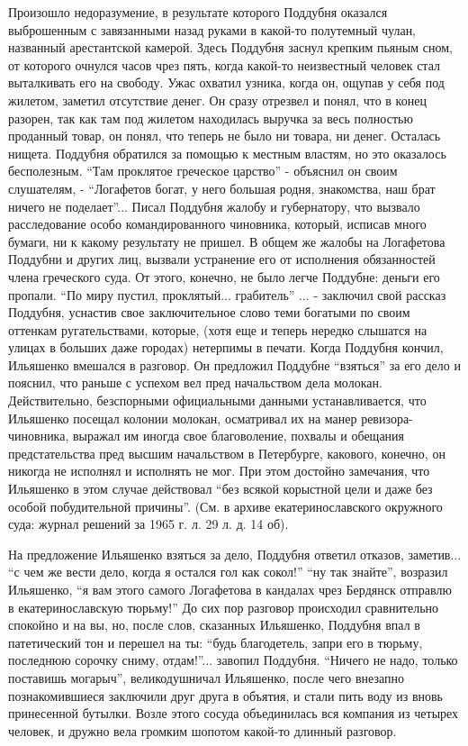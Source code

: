 \documentclass[a4paper,20pt]{article}
\begin{document}
Произошло недоразумение, в результате которого Поддубня оказался выброшенным с
завязанными назад руками в какой-то полутемный чулан, названный арестантской
камерой.  Здесь Поддубня заснул крепким пьяным сном, от которого очнулся часов
чрез пять, когда какой-то неизвестный человек стал выталкивать его на свободу.
Ужас охватил узника, когда он, ощупав у себя под жилетом, заметил отсутствие
денег. Он сразу отрезвел и понял, что в конец разорен, так как там под жилетом
находилась выручка за весь полностью проданный товар, он понял, что теперь не
было ни товара, ни денег. Осталась нищета. Поддубня обратился за помощью к
местным властям, но это оказалось бесполезным. ``Там проклятое греческое
царство'' - объяснил он своим слушателям, - ``Логафетов богат, у него большая
родня, знакомства, наш брат ничего не поделает''...  Писал Поддубня жалобу и
губернатору, что вызвало расследование особо командированного чиновника,
который, исписав много бумаги, ни к какому результату не пришел. В общем же
жалобы на Логафетова Поддубни и других лиц, вызвали
устранение его от исполнения обязанностей члена греческого суда. От этого,
конечно, не было легче Поддубне: деньги его пропали. ``По миру пустил,
проклятый... грабитель'' ... - заключил свой рассказ Поддубня, уснастив свое
заключительное слово теми богатыми по своим оттенкам ругательствами, которые,
(хотя еще и теперь нередко слышатся на улицах в больших даже городах) нетерпимы
в печати.  Когда Поддубня кончил, Ильяшенко вмешался в разговор. Он предложил
Поддубне ``взяться'' за его дело и пояснил, что раньше с успехом вел пред
начальством дела молокан.  Действительно, безспорными официальными данными
устанавливается, что Ильяшенко посещал колонии молокан, осматривал их на манер
ревизора-чиновника, выражал им иногда свое благоволение, похвалы и обещания
предстательства пред высшим начальством в Петербурге, какового, конечно, он
никогда не исполнял и исполнять не мог. При
этом достойно замечания, что Ильяшенко в этом случае действовал ``без всякой
корыстной цели и даже без особой побудительной причины''. (См. в архиве
екатеринославского окружного суда: журнал решений за 1965 г. л. 29 л. д. 14
об).

На предложение Ильяшенко взяться за дело, Поддубня ответил отказов, заметив...
``с чем же вести дело, когда я остался гол как сокол!'' ``ну так знайте'', возразил Ильяшенко, ``я вам этого самого 
Логафетова в кандалах чрез Бердянск отправлю в екатеринославскую тюрьму!''
До сих пор разговор происходил сравнительно
спокойно и на вы, но, после слов, сказанных Ильяшенко,
Поддубня впал в патетический тон и перешел на ты:
``будь благодетель, запри его в тюрьму, последнюю сорочку сниму, отдам!''... завопил Поддубня. ``Ничего не надо,
только поставишь могарыч'', великодушничал Ильяшенко, 
после чего внезапно познакомившиеся заключили друг друга в объятия, 
и стали пить воду из вновь принесенной бутылки. Возле этого сосуда объединилась вся компания из
четырех человек, и дружно вела громким шопотом какой-то длинный разговор.
\end{document}
